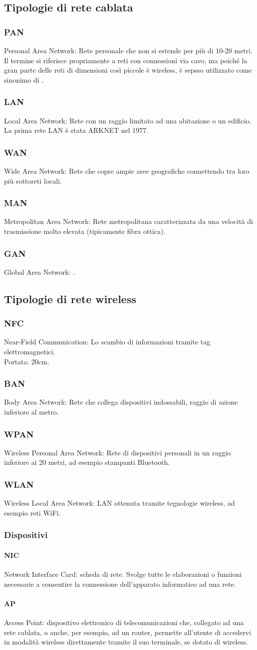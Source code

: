 \documentclass[a4paper,11pt]{article}
\def\sub#1{\subsection{#1}\label{#1}}
\def\subsub#1{\subsubsection{#1}\label{#1}}
\def\para#1{\paragraph{#1}\label{#1}}
\def\vedi#1{\nameref{#1}}
\begin{document}
\newpage
\sub{Tipologie di rete cablata}
\subsub{PAN} Personal Area Network: Rete personale che non si estende per più di 10-20 metri. Il termine si riferisce propriamente a reti con connessioni via cavo, ma poiché la gran parte delle reti di dimensioni così piccole è wireless, è sepsso utilizzato come sinonimo di \vedi{WPAN}. 
\subsub{LAN} Local Area Network: Rete con un raggio limitato ad una abitazione o un edificio. La prima rete LAN è stata ARKNET nel 1977. 
\subsub{WAN} Wide Area Network: Rete che copre ampie aree geografiche connettendo tra loro più sottoreti locali. 
\subsub{MAN} Metropolitan Area Network: Rete metropolitana caratterizzata da una velocità di trasmissione molto elevata (tipicamente fibra ottica).
\subsub{GAN} Global Area Network: \vedi{Internet}.

\sub{Tipologie di rete wireless}
\subsub{NFC} Near-Field Communication: Lo scambio di informazioni tramite tag elettromagnetici.\\ Portata: 20cm.
\subsub{BAN} Body Area Network: Rete che collega dispositivi indossabili, raggio di azione inferiore al metro.
\subsub{WPAN} Wireless Personal Area Network: Rete di dispositivi personali in un raggio inferiore ai 20 metri, ad esempio stampanti Bluetooth.
\subsub{WLAN} Wireless Local Area Network: LAN ottenuta tramite tegnologie wireless, ad esempio reti WiFi. 
\subsubsection*{Dispositivi}
\para{NIC} Network Interface Card: scheda di rete. Svolge tutte le elaborazioni o funzioni necessarie a consentire la connessione dell'apparato informatico ad una rete.
\para{AP} Access Point:  dispositivo elettronico di telecomunicazioni che, collegato ad una rete cablata, o anche, per esempio, ad un router, permette all'utente di accedervi in modalità wireless direttamente tramite il suo terminale, se dotato di \vedi{NIC} wireless.
\end{document}
